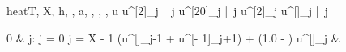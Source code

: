 \documentclass[12pt,a4paper]{book}
\begin{document}

\begin{eqcode}{heat}{T, X, h, \tau, a}{, , ,
, }{}
  \pi {} \lend
  u \in {} \lend
  u^{[2]}_j |\ \forall j  \lend
  u^{[20]}_j |\ \forall j \gets u^{[2]}_j \lend %
  u^{[\iter]}_j |\ \forall j \quad \; \; \gets 
  \begin{cases}
    0 & j: j = 0 \cup j = X - 1 \lend
   \cdot (u^{[]}_{j-1} +
    u^{[\iter - 1]}_{j+1}) + (1.0 - ) \cdot
    u^{[]}_j & \otherwise \lend
  \end{cases} \lend
   \lend
\end{eqcode}
\end{document}
